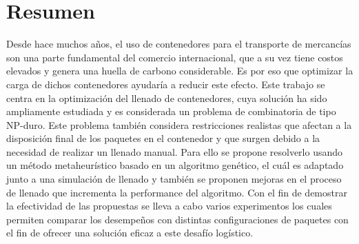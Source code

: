 \documentclass[openany]{article}
\begin{document}
\vspace{2cm}

\section*{Resumen}

Desde hace muchos años, el uso de contenedores para el transporte de mercancías son una parte fundamental del comercio internacional, que a su vez tiene costos elevados y genera una huella de carbono considerable. Es por eso que optimizar la carga de dichos contenedores ayudaría a reducir este efecto. Este trabajo se centra en la optimización del llenado de contenedores, cuya solución ha sido ampliamente estudiada y es considerada un problema de combinatoria de tipo NP-duro. Este problema también considera restricciones realistas que afectan a la disposición final de los paquetes en el contenedor y que surgen debido a la necesidad de realizar un llenado manual. Para ello se propone resolverlo usando un método metaheurístico basado en un algoritmo genético, el cuál es adaptado junto a una simulación de llenado y también se proponen mejoras en el proceso de llenado que incrementa la performance del algoritmo. Con el fin de demostrar la efectividad de las propuestas se lleva a cabo varios experimentos los cuales permiten comparar los desempeños con distintas configuraciones de paquetes con el fin de ofrecer una solución eficaz a este desafío logístico.

%









\newpage
\thispagestyle{plain}
{
    \tableofcontents
}
\end{document}
